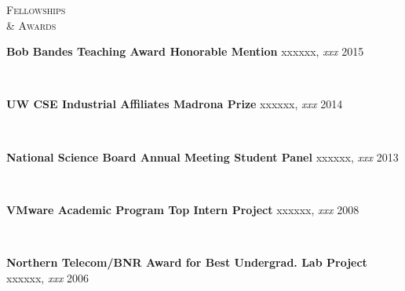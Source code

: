 \documentclass[10pt,minionpro]{report}
\newlength{\sectiongap}
\newlength{\entrygap}
\newlength{\sectioncolwidth}
\newlength{\colgap}
\newlength{\stuffwidth}
\def\ifEqString#1#2{\def\testa{#1}\def\testb{#2}%
  \ifx\testa\testb}
\newenvironment{rtable}{
  \begin{minipage}{\textwidth}
  }{
  \end{minipage}
}
\newenvironment{rentry}[3][xxx]{
  \begin{minipage}[t]{\hsize}
    \textbf{#2}\ifEqString{#1}{xxx}\relax\else, \textit{#1}\fi
    \hspace{\stretch{1}} #3 \\
  }{
    \removelastskip
  \end{minipage}
  \\[\entrygap]  %
}
\newenvironment{rsection}[1]{
  \begin{minipage}[t]{\sectioncolwidth}
    \textsc{#1}
  \end{minipage}
  \hspace{\colgap}
  \begin{minipage}[t]{\stuffwidth}
  }{
    \removelastskip
  \end{minipage}
  \\[\sectiongap]
}
\begin{document}
\begin{rtable}
\begin{rsection}{Fellowships\\\& Awards}
    \begin{rentry}{Bob Bandes Teaching Award Honorable Mention}{2015}
      \vspace{-0.75em}
    \end{rentry} 
    \begin{rentry}{UW CSE Industrial Affiliates Madrona Prize}{2014}
       \vspace{-0.75em}
    \end{rentry}
    \begin{rentry}{National Science Board Annual Meeting Student
        Panel}{2013}
      \vspace{-0.75em}
    \end{rentry}
    \begin{rentry}{VMware Academic Program Top Intern Project}{2008}
       \vspace{-0.75em}
    \end{rentry}
    \begin{rentry}{Northern Telecom/BNR Award for Best Undergrad. Lab
        Project}{2006}
      \vspace{-0.75em}
    \end{rentry}
  \end{rsection}


\end{rtable}
\end{document}
